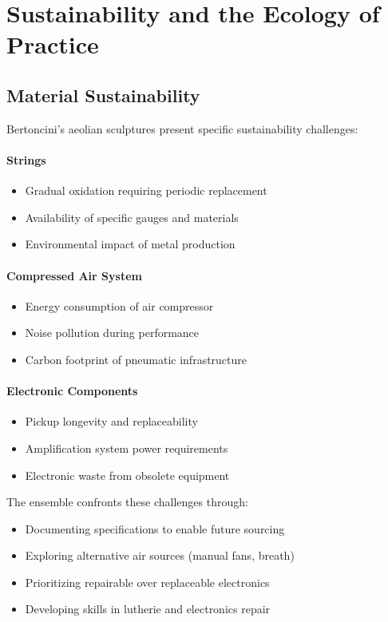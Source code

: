 \section{Sustainability and the Ecology of Practice}

\subsection{Material Sustainability}

Bertoncini's aeolian sculptures present specific sustainability challenges:

\paragraph{Strings}
\begin{itemize}
  \item Gradual oxidation requiring periodic replacement
  \item Availability of specific gauges and materials
  \item Environmental impact of metal production
\end{itemize}

\paragraph{Compressed Air System}
\begin{itemize}
  \item Energy consumption of air compressor
  \item Noise pollution during performance
  \item Carbon footprint of pneumatic infrastructure
\end{itemize}

\paragraph{Electronic Components}
\begin{itemize}
  \item Pickup longevity and replaceability
  \item Amplification system power requirements
  \item Electronic waste from obsolete equipment
\end{itemize}

The ensemble confronts these challenges through:
\begin{itemize}
  \item Documenting specifications to enable future sourcing
  \item Exploring alternative air sources (manual fans, breath)
  \item Prioritizing repairable over replaceable electronics
  \item Developing skills in lutherie and electronics repair
\end{itemize}

